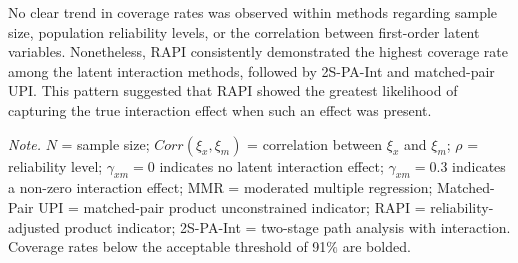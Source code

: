 \documentclass[
  man]{apa6}
\newenvironment{lltable}{\begin{landscape}\centering\begin{ThreePartTable}}{\end{ThreePartTable}\end{landscape}}
\begin{document}
No clear trend in coverage rates was observed within methods regarding sample size, population reliability levels, or the correlation between first-order latent variables. Nonetheless, RAPI consistently demonstrated the highest coverage rate among the latent interaction methods, followed by 2S-PA-Int and matched-pair UPI. This pattern suggested that RAPI showed the greatest likelihood of capturing the true interaction effect when such an effect was present.

\begin{lltable}

\begin{TableNotes}[para]
\normalsize{\textit{Note.} $\textit{N}$ = sample size; $Corr(\xi_{x}, \xi_{m})$ = correlation between $\xi_{x}$ and $\xi_{m}$; $\rho$ = reliability level; $\gamma_{xm} = 0$ indicates no latent interaction effect; $\gamma_{xm} = 0.3$ indicates a non-zero interaction effect; MMR = moderated multiple regression; Matched-Pair UPI = matched-pair product unconstrained indicator; RAPI = reliability-adjusted product indicator; 2S-PA-Int = two-stage path analysis with interaction. Coverage rates below the acceptable threshold of 91$\%$ are bolded.}
\end{TableNotes}

\tiny{

}
\end{lltable}
\end{document}
